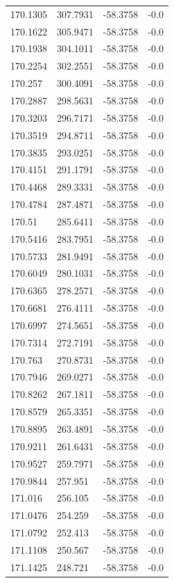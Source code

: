 \begin{table}[H]
\begin{tabular}{llll}
170.1305 & 307.7931 & -58.3758 & -0.0 \\
170.1622 & 305.9471 & -58.3758 & -0.0 \\
170.1938 & 304.1011 & -58.3758 & -0.0 \\
170.2254 & 302.2551 & -58.3758 & -0.0 \\
170.257 & 300.4091 & -58.3758 & -0.0 \\
170.2887 & 298.5631 & -58.3758 & -0.0 \\
170.3203 & 296.7171 & -58.3758 & -0.0 \\
170.3519 & 294.8711 & -58.3758 & -0.0 \\
170.3835 & 293.0251 & -58.3758 & -0.0 \\
170.4151 & 291.1791 & -58.3758 & -0.0 \\
170.4468 & 289.3331 & -58.3758 & -0.0 \\
170.4784 & 287.4871 & -58.3758 & -0.0 \\
170.51 & 285.6411 & -58.3758 & -0.0 \\
170.5416 & 283.7951 & -58.3758 & -0.0 \\
170.5733 & 281.9491 & -58.3758 & -0.0 \\
170.6049 & 280.1031 & -58.3758 & -0.0 \\
170.6365 & 278.2571 & -58.3758 & -0.0 \\
170.6681 & 276.4111 & -58.3758 & -0.0 \\
170.6997 & 274.5651 & -58.3758 & -0.0 \\
170.7314 & 272.7191 & -58.3758 & -0.0 \\
170.763 & 270.8731 & -58.3758 & -0.0 \\
170.7946 & 269.0271 & -58.3758 & -0.0 \\
170.8262 & 267.1811 & -58.3758 & -0.0 \\
170.8579 & 265.3351 & -58.3758 & -0.0 \\
170.8895 & 263.4891 & -58.3758 & -0.0 \\
170.9211 & 261.6431 & -58.3758 & -0.0 \\
170.9527 & 259.7971 & -58.3758 & -0.0 \\
170.9844 & 257.951 & -58.3758 & -0.0 \\
171.016 & 256.105 & -58.3758 & -0.0 \\
171.0476 & 254.259 & -58.3758 & -0.0 \\
171.0792 & 252.413 & -58.3758 & -0.0 \\
171.1108 & 250.567 & -58.3758 & -0.0 \\
171.1425 & 248.721 & -58.3758 & -0.0 \\

\end{tabular}
\end{table}

